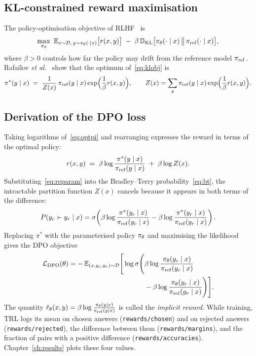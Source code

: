 \subsection{KL-constrained reward maximisation}
The policy-optimisation objective of RLHF~\cite{ziegler2019finetuning,ouyang2022instructgpt} is
\begin{equation}
  \max_{\pit}\ \mathbb{E}_{x\sim\mathcal{D},\,y\sim\pit(\cdot\mid x)}\big[r(x,y)\big] \;-\; \beta\,\mathbb{D}_{\mathrm{KL}}\big[\pit(\cdot\mid x)\,\big\|\,\piref(\cdot\mid x)\big],
  \label{eq:klobj}
\end{equation}
where $\beta>0$ controls how far the policy may drift from the reference model $\pi_{\mathrm{ref}}$. Rafailov \emph{et al.}~\cite{rafailov2023dpo} show that the optimum of~\eqref{eq:klobj} is
\begin{equation}
  \pi^*(y\mid x) \;=\; \frac{1}{Z(x)}\,\pi_{\mathrm{ref}}(y\mid x)\exp\!\Big(\frac{1}{\beta}r(x,y)\Big),\qquad Z(x)=\sum_y \pi_{\mathrm{ref}}(y\mid x)\exp\!\Big(\frac{1}{\beta}r(x,y)\Big).
  \label{eq:optpi}
\end{equation}

\subsection{Derivation of the DPO loss}
Taking logarithms of~\eqref{eq:optpi} and rearranging expresses the reward in terms of the optimal policy:
\begin{equation}
  r(x,y) \;=\; \beta\log\frac{\pi^*(y\mid x)}{\pi_{\mathrm{ref}}(y\mid x)} \;+\; \beta\log Z(x).
  \label{eq:reparam}
\end{equation}
Substituting~\eqref{eq:reparam} into the Bradley--Terry probability~\eqref{eq:bt}, the intractable partition function $Z(x)$ cancels because it appears in both terms of the difference:
\begin{equation}
  P(y_c\succ y_r\mid x) = \sigma\!\left(\beta\log\frac{\pi^*(y_c\mid x)}{\pi_{\mathrm{ref}}(y_c\mid x)} - \beta\log\frac{\pi^*(y_r\mid x)}{\pi_{\mathrm{ref}}(y_r\mid x)}\right).
\end{equation}
Replacing $\pi^*$ with the parameterised policy $\pi_\theta$ and maximising the likelihood gives the DPO objective
\begin{equation}
  \begin{split}
  \mathcal{L}_{\mathrm{DPO}}(\theta) = -\,\mathbb{E}_{(x,y_c,y_r)\sim\mathcal{D}}\Bigg[\log\sigma\Bigg(&\beta\log\frac{\pi_\theta(y_c\mid x)}{\pi_{\mathrm{ref}}(y_c\mid x)}\\
  &- \beta\log\frac{\pi_\theta(y_r\mid x)}{\pi_{\mathrm{ref}}(y_r\mid x)}\Bigg)\Bigg].
  \end{split}
  \label{eq:dpo}
\end{equation}
The quantity $\hat r_\theta(x,y) = \beta\log\frac{\pi_\theta(y\mid x)}{\pi_{\mathrm{ref}}(y\mid x)}$ is called the \emph{implicit reward}. While training, TRL logs its mean on chosen answers (\texttt{rewards/chosen}) and on rejected answers (\texttt{rewards/rejected}), the difference between them (\texttt{rewards/margins}), and the fraction of pairs with a positive difference (\texttt{rewards/accuracies}). Chapter~\ref{ch:results} plots these four values.

